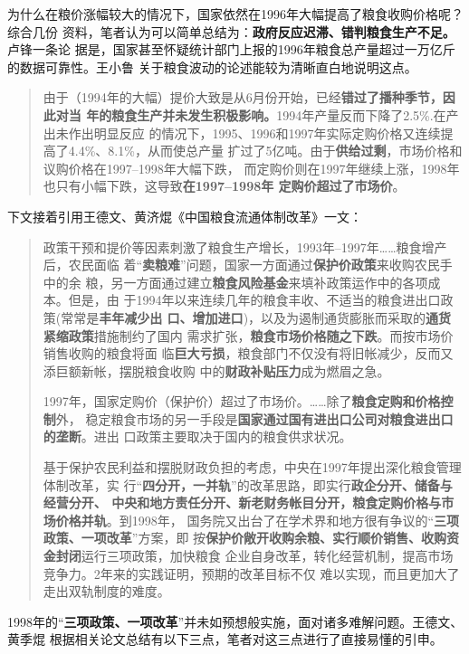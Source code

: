 为什么在粮价涨幅较大的情况下，国家依然在1996年大幅提高了粮食收购价格呢？综合几份
资料，笔者认为可以简单总结为：\textbf{政府反应迟滞、错判粮食生产不足。}卢锋一条论
据是，国家甚至怀疑统计部门上报的1996年粮食总产量超过一万亿斤的数据可靠性。王小鲁
关于粮食波动的论述能较为清晰直白地说明这点。
\begin{quotation}
  由于（1994年的大幅）提价大致是从6月份开始，已经\textbf{错过了播种季节，因此对当
    年的粮食生产并未发生积极影响。}1994年产量反而下降了2.5\%.在产出未作出明显反应
  的情况下，1995、1996和1997年实际定购价格又连续提高了4.4\%、8.1\%，从而使总产量
  扩过了5亿吨。由于\textbf{供给过剩}，市场价格和议购价格在1997--1998年大幅下跌，
  而定购价则在1997年继续上涨，1998年也只有小幅下跌，这导致\textbf{在1997--1998年
    定购价超过了市场价}。\cite{wangxiaoluliangshi}
\end{quotation}

下文接着引用王德文、黄济焜《中国粮食流通体制改革》一文：
\begin{quotation}
  政策干预和提价等因素刺激了粮食生产增长，1993年--1997年……粮食增产后，农民面临
  着“\textbf{卖粮难}”问题，国家一方面通过\textbf{保护价政策}来收购农民手中的余
  粮，另一方面通过建立\textbf{粮食风险基金}来填补政策运作中的各项成本。但是，由
  于1994年以来连续几年的粮食丰收、不适当的粮食进出口政策(常常是\textbf{丰年减少出
    口、增加进口})，以及为遏制通货膨胀而采取的\textbf{通货紧缩政策}措施制约了国内
  需求扩张，\textbf{粮食市场价格随之下跌}。而按市场价销售收购的粮食将面
  临\textbf{巨大亏损}，粮食部门不仅没有将旧帐减少，反而又添巨额新帐，摆脱粮食收购
  中的\textbf{财政补贴压力}成为燃眉之急。

  1997年，国家定购价（保护价）超过了市场价。……除了\textbf{粮食定购和价格控制}外，
  稳定粮食市场的另一手段是\textbf{国家通过国有进出口公司对粮食进出口的垄断}。进出
  口政策主要取决于国内的粮食供求状况。

  基于保护农民利益和摆脱财政负担的考虑，中央在1997年提出深化粮食管理体制改革，实
  行“\textbf{四分开，一并轨}”的改革思路，即实行\textbf{政企分开、储备与经营分开、
    中央和地方责任分开、新老财务帐目分开，粮食定购价格与市场价格并轨}。到1998年，
  国务院又出台了在学术界和地方很有争议的“\textbf{三项政策、一项改革}”方案，即
  按\textbf{保护价敞开收购余粮、实行顺价销售、收购资金封闭}运行三项政策，加快粮食
  企业自身改革，转化经营机制，提高市场竞争力。2年来的实践证明，预期的改革目标不仅
  难以实现，而且更加大了走出双轨制度的难度。\cite{shuangguizhi}
\end{quotation}

1998年的“\textbf{三项政策、一项改革}”并未如预想般实施，面对诸多难解问题。王德文、黄季焜
根据相关论文总结有以下三点，笔者对这三点进行了直接易懂的引申。

